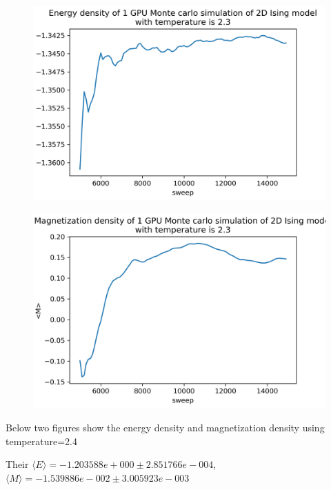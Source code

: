 \documentclass{article}
\begin{document}
	\begin{figure}[hb!]
		\centering
		\includegraphics[width=0.9\linewidth]{notebook/1gpu_2.3_E}
	\end{figure}
	\begin{figure}[hb!]
		\centering
		\includegraphics[width=0.9\linewidth]{notebook/1gpu_2.3_M}
	\end{figure}
	\newpage
	
	
	Below two figures show the energy density and magnetization density using temperature=2.4
	
	Their $\langle E\rangle = -1.203588e+000 \pm 2.851766e-004$, $\langle M\rangle = -1.539886e-002 \pm 3.005923e-003$
	
\end{document}
